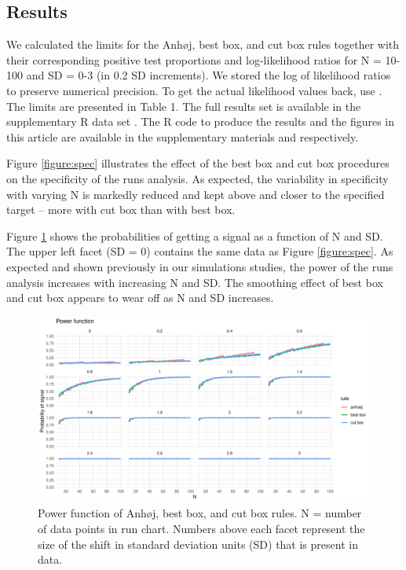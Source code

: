 \hypertarget{results}{%
\subsection{Results}\label{results}}

We calculated the limits for the Anhøj, best box, and cut box rules
together with their corresponding positive test proportions and
log-likelihood ratios for N = 10-100 and SD = 0-3 (in 0.2 SD
increments). We stored the log of likelihood ratios to preserve
numerical precision. To get the actual likelihood values back, use
. The limits are presented in Table 1. The
full results set is available in the supplementary R data set
. The R code to produce the results and the figures
in this article are available in the supplementary materials
 and  respectively.

Figure \ref{figure:spec} illustrates the effect of the best box and cut
box procedures on the specificity of the runs analysis. As expected, the
variability in specificity with varying N is markedly reduced and kept
above and closer to the specified target -- more with cut box than with
best box.

Figure \ref{figure:pwr} shows the probabilities of getting a signal as a
function of N and SD. The upper left facet (SD = 0) contains the same
data as Figure \ref{figure:spec}. As expected and shown previously in
our simulations studies, the power of the runs analysis increases with
increasing N and SD. The smoothing effect of best box and cut box
appears to wear off as N and SD increases.

\begin{figure}[htbp]
  \centering
  \includegraphics[width=\textwidth]{fig_pwr.pdf}
  \caption{Power function of Anhøj, best box, and cut box rules.
           N = number of data points in run chart.
           Numbers above each facet represent the size of the shift in standard
           deviation units (SD) that is present in data.}
  \label{figure:pwr}
\end{figure}

